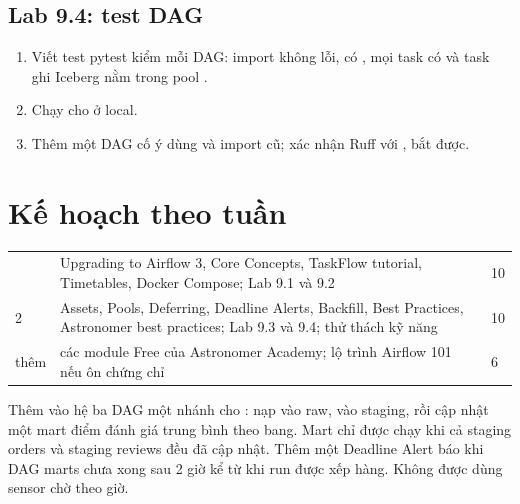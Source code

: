 \subsection{Lab 9.4: test DAG}
\begin{enumerate}
  \item Viết test pytest kiểm mỗi DAG: import không lỗi, có , mọi task có  và task ghi Iceberg nằm trong pool .
  \item Chạy  cho  ở local.
  \item Thêm một DAG cố ý dùng  và import cũ; xác nhận Ruff với ,  bắt được.
\end{enumerate}

\section{Kế hoạch theo tuần}
\begin{xltabular}{\textwidth}{@{}P{1.4cm} L P{1.4cm}@{}}
\toprule
{} &  &  \\
\midrule
\endhead
\bottomrule
{} & Upgrading to Airflow 3, Core Concepts, TaskFlow tutorial, Timetables, Docker Compose; Lab 9.1 và 9.2 & 10 \\
2 & Assets, Pools, Deferring, Deadline Alerts, Backfill, Best Practices, Astronomer best practices; Lab 9.3 và 9.4; thử thách kỹ năng & 10 \\
thêm & các module Free của Astronomer Academy; lộ trình Airflow 101 nếu ôn chứng chỉ & 6 \\
\end{xltabular}

\begin{thuthach}
Thêm vào hệ ba DAG một nhánh cho : nạp vào raw,  vào staging, rồi cập nhật một mart điểm đánh giá trung bình theo bang. Mart chỉ được chạy khi cả staging orders và staging reviews đều đã cập nhật. Thêm một Deadline Alert báo khi DAG marts chưa xong sau 2 giờ kể từ khi run được xếp hàng. Không được dùng sensor chờ theo giờ.
\end{thuthach}

